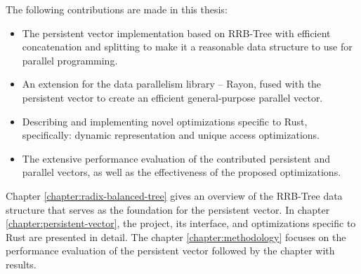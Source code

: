 The following contributions are made in this thesis:
\begin{itemize}
    \item The persistent vector implementation based on RRB-Tree with efficient concatenation and splitting to make it a reasonable data structure to use for parallel programming.
    \item An extension for the data parallelism library -- Rayon, fused with the persistent vector to create an efficient general-purpose parallel vector.
    \item Describing and implementing novel optimizations specific to Rust, specifically: dynamic representation and unique access optimizations.
    \item The extensive performance evaluation of the contributed persistent and parallel vectors, as well as the effectiveness of the proposed optimizations.
\end{itemize}

Chapter \ref{chapter:radix-balanced-tree} gives an overview of the RRB-Tree data structure that serves as the foundation for the persistent vector. In chapter \ref{chapter:persistent-vector}, the \pvecrs{} project, its interface, and optimizations specific to Rust are presented in detail. The chapter \ref{chapter:methodology} focuses on the performance evaluation of the persistent vector followed by the chapter with results.
